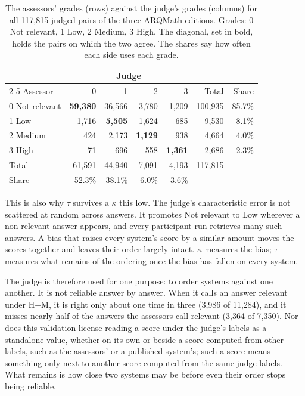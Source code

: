 \begin{table}[t]
\centering
\small
\renewcommand{\arraystretch}{1.15}
\begin{tabular}{lrrrrrr}
\toprule
& \multicolumn{4}{c}{Judge} & & \\
\cmidrule(lr){2-5}
Assessor & 0 & 1 & 2 & 3 & Total & Share \\
\midrule
0 Not relevant & \textbf{59{,}380} & 36{,}566 & 3{,}780 & 1{,}209 & 100{,}935 & 85.7\% \\
1 Low          &  1{,}716 &  \textbf{5{,}505} & 1{,}624 &    685 &   9{,}530 &  8.1\% \\
2 Medium       &     424 &  2{,}173 & \textbf{1{,}129} &    938 &   4{,}664 &  4.0\% \\
3 High         &      71 &     696 &    558 & \textbf{1{,}361} &   2{,}686 &  2.3\% \\
\midrule
Total          & 61{,}591 & 44{,}940 & 7{,}091 & 4{,}193 & 117{,}815 & \\
Share          & 52.3\%   & 38.1\%   & 6.0\%   & 3.6\%   &           & \\
\bottomrule
\end{tabular}
\caption[The assessors' grades against the judge's]{The assessors' grades (rows) against the judge's grades (columns) for all
117{,}815 judged pairs of the three ARQMath editions. Grades: 0 Not relevant, 1 Low,
2 Medium, 3 High. The diagonal, set in bold, holds the pairs on which the two agree. The shares say
how often each side uses each grade.}
\label{tab:met-judge-confusion}
\end{table}

This is also why $\tau$ survives a $\kappa$ this low. The judge's characteristic error
is not scattered at random across answers. It promotes Not relevant to Low wherever a
non-relevant answer appears, and every participant run retrieves many such answers. A
bias that raises every system's score by a similar amount moves the scores together
and leaves their order largely intact. $\kappa$ measures the bias; $\tau$ measures
what remains of the ordering once the bias has fallen on every system.

The judge is therefore used for one purpose: to order systems against one another. It
is not reliable answer by answer. When it calls an answer relevant under H+M, it is
right only about one time in three (3{,}986 of 11{,}284), and it misses nearly half
of the answers the assessors call relevant (3{,}364 of 7{,}350). Nor does this
validation license reading a score under the judge's labels as a standalone value,
whether on its own or beside a score computed from other labels, such as the
assessors' or a published system's; such a score means something only next to
another score computed from the same judge labels. What remains is how close two
systems may be before even their order stops being reliable.


